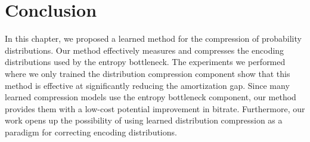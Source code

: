 



%
%




\section{Conclusion}
\label{sec:pdf_compression/conclusion}

In this chapter, we proposed a learned method for the compression of probability distributions.
Our method effectively measures and compresses the encoding distributions used by the entropy bottleneck.
The experiments we performed where we only trained the distribution compression component show that this method is effective at significantly reducing the amortization gap.
Since many learned compression models use the entropy bottleneck component, our method provides them with a low-cost potential improvement in bitrate.
Furthermore, our work opens up the possibility of using learned distribution compression as a paradigm for correcting encoding distributions.



%
%
%
%




